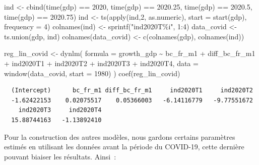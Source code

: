 \documentclass[
  a4paper,
  DIV=11,
  numbers=noendperiod,
  french]{scrartcl}
\newenvironment{Shaded}{\begin{snugshade}}{\end{snugshade}}
\newcommand{\AttributeTok}[1]{\textcolor[rgb]{0.40,0.45,0.13}{#1}}
\newcommand{\DecValTok}[1]{\textcolor[rgb]{0.68,0.00,0.00}{#1}}
\newcommand{\FloatTok}[1]{\textcolor[rgb]{0.68,0.00,0.00}{#1}}
\newcommand{\FunctionTok}[1]{\textcolor[rgb]{0.28,0.35,0.67}{#1}}
\newcommand{\NormalTok}[1]{\textcolor[rgb]{0.00,0.23,0.31}{#1}}
\newcommand{\OtherTok}[1]{\textcolor[rgb]{0.00,0.23,0.31}{#1}}
\newcommand{\SpecialCharTok}[1]{\textcolor[rgb]{0.37,0.37,0.37}{#1}}
\newcommand{\StringTok}[1]{\textcolor[rgb]{0.13,0.47,0.30}{#1}}
\newcommand\1{{\mathds 1}}
\theoremstyle{remark}
\begin{document}
\begin{Shaded}
\begin{Highlighting}[]
\NormalTok{ind }\OtherTok{\textless{}{-}} \FunctionTok{cbind}\NormalTok{(}\FunctionTok{time}\NormalTok{(gdp) }\SpecialCharTok{==} \DecValTok{2020}\NormalTok{, }\FunctionTok{time}\NormalTok{(gdp) }\SpecialCharTok{==} \FloatTok{2020.25}\NormalTok{, }
             \FunctionTok{time}\NormalTok{(gdp) }\SpecialCharTok{==} \FloatTok{2020.5}\NormalTok{, }\FunctionTok{time}\NormalTok{(gdp) }\SpecialCharTok{==} \FloatTok{2020.75}\NormalTok{)}
\NormalTok{ind }\OtherTok{\textless{}{-}} \FunctionTok{ts}\NormalTok{(}\FunctionTok{apply}\NormalTok{(ind,}\DecValTok{2}\NormalTok{, as.numeric), }\AttributeTok{start =} \FunctionTok{start}\NormalTok{(gdp), }\AttributeTok{frequency =} \DecValTok{4}\NormalTok{)}
\FunctionTok{colnames}\NormalTok{(ind) }\OtherTok{\textless{}{-}} \FunctionTok{sprintf}\NormalTok{(}\StringTok{"ind2020T\%i"}\NormalTok{, }\DecValTok{1}\SpecialCharTok{:}\DecValTok{4}\NormalTok{)}
\NormalTok{data\_covid }\OtherTok{\textless{}{-}} \FunctionTok{ts.union}\NormalTok{(gdp, ind)}
\FunctionTok{colnames}\NormalTok{(data\_covid) }\OtherTok{\textless{}{-}} \FunctionTok{c}\NormalTok{(}\FunctionTok{colnames}\NormalTok{(gdp), }\FunctionTok{colnames}\NormalTok{(ind))}

\NormalTok{reg\_lin\_covid }\OtherTok{\textless{}{-}} \FunctionTok{dynlm}\NormalTok{(}
  \AttributeTok{formula =}\NormalTok{ growth\_gdp }\SpecialCharTok{\textasciitilde{}}\NormalTok{ bc\_fr\_m1 }\SpecialCharTok{+}\NormalTok{ diff\_bc\_fr\_m1 }\SpecialCharTok{+}
\NormalTok{    ind2020T1 }\SpecialCharTok{+}\NormalTok{ ind2020T2 }\SpecialCharTok{+}\NormalTok{ ind2020T3 }\SpecialCharTok{+}\NormalTok{ ind2020T4,}
  \AttributeTok{data =} \FunctionTok{window}\NormalTok{(data\_covid, }\AttributeTok{start =} \DecValTok{1980}\NormalTok{)}
\NormalTok{)}
\FunctionTok{coef}\NormalTok{(reg\_lin\_covid)}
\end{Highlighting}
\end{Shaded}

\begin{verbatim}
  (Intercept)      bc_fr_m1 diff_bc_fr_m1     ind2020T1     ind2020T2 
  -1.62422153    0.02075517    0.05366003   -6.14116779   -9.77551672 
    ind2020T3     ind2020T4 
  15.88744163   -1.13892410 
\end{verbatim}

Pour la construction des autres modèles, nous gardons certains
paramètres estimés en utilisant les données avant la période du
COVID-19, cette dernière pouvant biaiser les résultats. Ainsi~:
\end{document}
